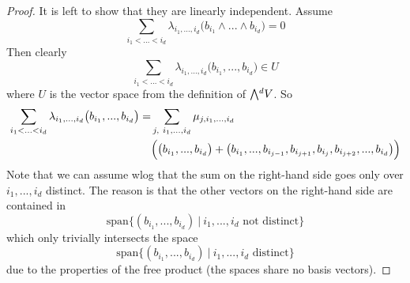 \documentclass{scrartcl}
\newcommand{\extpow}{\mathchoice{{\textstyle\bigwedge}}
    {{\bigwedge}}
    {{\textstyle\wedge}}
    {{\scriptstyle\wedge}}}
\newcommand{\vspan}{\mathrm{span}}
\theoremstyle{definition}
\begin{document}
\begin{proof}
    It is left to show that they are linearly independent.
    Assume
    \begin{equation*}
        \sum_{i_1 < ... < i_d} \lambda_{i_1, ..., i_d} \bigl( b_{i_1} \wedge ... \wedge b_{i_d} \bigr) = 0
    \end{equation*}
    Then clearly
    \begin{equation*}
        \sum_{i_1 < ... < i_d} \lambda_{i_1, ..., i_d} \bigl( b_{i_1}, ..., b_{i_d} \bigr) \in U
    \end{equation*}
    where $U$ is the vector space from the definition of $\extpow^d V$.
    So
    \begin{align*}
        \sum_{i_1 < ... < i_d} \lambda_{i_1, ..., i_d} \bigl( b_{i_1}, ..., b_{i_d} \bigr) = &\sum_{j, \ i_1, ..., i_d} \mu_{j, i_1, ..., i_d} \\
        &\Bigl( \bigl( b_{i_1}, ..., b_{i_d} \bigr) + \bigl( b_{i_1}, ..., b_{i_{j - 1}}, b_{i_{j + 1}}, b_{i_j}, b_{i_{j + 2}}, ..., b_{i_d} \bigr) \Bigr)
    \end{align*}
    Note that we can assume wlog that the sum on the right-hand side goes only over $i_1, ..., i_d$ distinct.
    The reason is that the other vectors on the right-hand side are contained in
    \begin{equation*}
       \vspan \{ (b_{i_1}, ..., b_{i_d}) \ | \ \text{$i_1, ..., i_d$ not distinct} \}
    \end{equation*}
    which only trivially intersects the space
    \begin{equation*}
        \vspan\{ (b_{i_1}, ..., b_{i_d}) \ | \ \text{$i_1, ..., i_d$ distinct} \}
    \end{equation*}
    due to the properties of the free product (the spaces share no basis vectors).


\end{proof}
\end{document}
